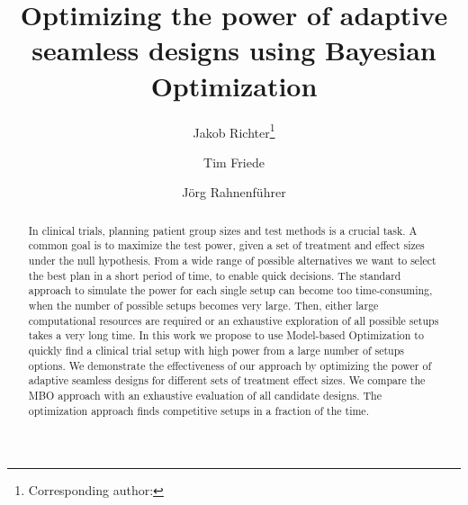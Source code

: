 \documentclass[bimj,fleqn]{w-art}
\theoremstyle{plain}
\theoremstyle{definition}
\begin{document}

\title[Model-based Optimization of Adaptive Seamless Designs]{Optimizing the power of adaptive seamless designs using Bayesian Optimization} %
\author[Jakob Richter {\it{et al.}}]{Jakob Richter\footnote{Corresponding author: {}}} 
\address[\inst{1}]{Fakultät Statistik, Technische Universität Dortmund, 44221 Dortmund}
\author[dd]{Tim Friede}
\address[\inst{2}]{Institut für Medizinische Statistik, Universitätsmedizin Göttingen, 37073 Göttingen}
\author[]{Jörg Rahnenführer} %
   

\makeatletter
\let\newtitle\@title
\makeatother

\begin{abstract}
In clinical trials, planning patient group sizes and test methods is a crucial task.
A common goal is to maximize the test power, given a set of treatment and effect sizes under the null hypothesis.
From a wide range of possible alternatives we want to select the best plan in a short period of time, to enable quick decisions.
The standard approach to simulate the power for each single setup can become too time-consuming, when the number of possible setups becomes very large.
Then, either large computational resources are required or an exhaustive exploration of all possible setups takes a very long time.
In this work we propose to use Model-based Optimization to quickly find a clinical trial setup with high power from a large number of setups options.
We demonstrate the effectiveness of our approach by optimizing the power of adaptive seamless designs for different sets of treatment effect sizes.
We compare the MBO approach with an exhaustive evaluation of all candidate designs.
The optimization approach finds competitive setups in a fraction of the time.
\end{abstract}
\end{document}
